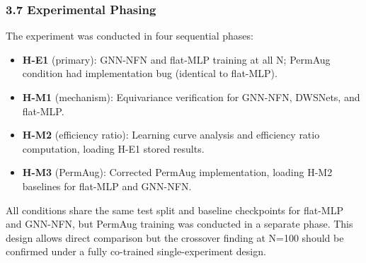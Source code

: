 \subsubsection{3.7 Experimental Phasing}

The experiment was conducted in four sequential phases:

\begin{itemize}
\item \textbf{H-E1} (primary): GNN-NFN and flat-MLP training at all N; PermAug condition had implementation bug (identical to flat-MLP).
\item \textbf{H-M1} (mechanism): Equivariance verification for GNN-NFN, DWSNets, and flat-MLP.
\item \textbf{H-M2} (efficiency ratio): Learning curve analysis and efficiency ratio computation, loading H-E1 stored results.
\item \textbf{H-M3} (PermAug): Corrected PermAug implementation, loading H-M2 baselines for flat-MLP and GNN-NFN.
\end{itemize}

All conditions share the same test split and baseline checkpoints for flat-MLP and GNN-NFN, but PermAug training was conducted in a separate phase. This design allows direct comparison but the crossover finding at N=100 should be confirmed under a fully co-trained single-experiment design.

